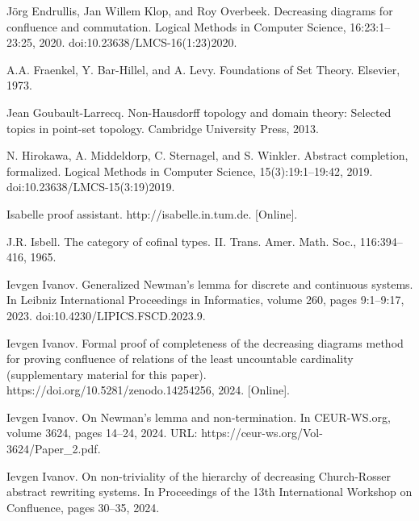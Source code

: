 \par\noindent  [10]  Jörg Endrullis, Jan Willem Klop, and Roy Overbeek.  Decreasing diagrams for confluence and commutation.  Logical Methods in Computer Science, 16:23:1–23:25, 2020.  doi:10.23638/LMCS-16(1:23)2020.  
 
\par\noindent  [11]  A.A. Fraenkel, Y. Bar-Hillel, and A. Levy.  Foundations of Set Theory.  Elsevier, 1973.  
 
\par\noindent  [12]  Jean Goubault-Larrecq.  Non-Hausdorff topology and domain theory: Selected topics in point-set topology.  Cambridge University Press, 2013.  
 
\par\noindent  [13]  N. Hirokawa, A. Middeldorp, C. Sternagel, and S. Winkler.  Abstract completion, formalized.  Logical Methods in Computer Science, 15(3):19:1–19:42, 2019.  doi:10.23638/LMCS-15(3:19)2019.  
 
\par\noindent  [14]  Isabelle proof assistant.  http://isabelle.in.tum.de.  [Online].  
 
\par\noindent  [15]  J.R. Isbell.  The category of cofinal types. II.  Trans. Amer. Math. Soc., 116:394–416, 1965.  
 
\par\noindent  [16]  Ievgen Ivanov.  Generalized Newman’s lemma for discrete and continuous systems.  In Leibniz International Proceedings in Informatics, volume 260, pages 9:1–9:17, 2023.  doi:10.4230/LIPICS.FSCD.2023.9.  
 
\par\noindent  [17]  Ievgen Ivanov.  Formal proof of completeness of the decreasing diagrams method for proving confluence of relations of the least uncountable cardinality (supplementary material for this paper).  https://doi.org/10.5281/zenodo.14254256, 2024.  [Online].  
 
\par\noindent  [18]  Ievgen Ivanov.  On Newman’s lemma and non-termination.  In CEUR-WS.org, volume 3624, pages 14–24, 2024.  URL: https://ceur-ws.org/Vol-3624/Paper\_2.pdf.  
 
\par\noindent  [19]  Ievgen Ivanov.  On non-triviality of the hierarchy of decreasing Church-Rosser abstract rewriting systems.  In Proceedings of the 13th International Workshop on Confluence, pages 30–35, 2024.  
 
